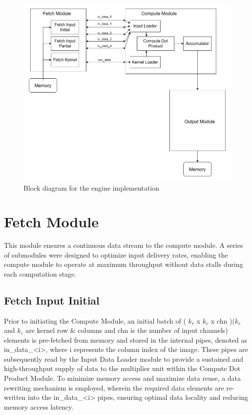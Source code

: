\begin{figure}[h]
    \centering
    \includegraphics[width=\linewidth]{../figures/Overview.png}
    \caption{Block diagram for the engine implementation}
\end{figure}
\section{Fetch Module}
This module ensures a continuous data stream to the compute module. A series of submodules were designed to optimize input delivery rates, enabling the compute module to operate at maximum throughput without data stalls during each computation stage.
\subsection{Fetch Input Initial}
Prior to initiating the Compute Module, an initial batch of ( $k_r$ x $k_c$ x chn )($k_r$ and $k_c$ are kernel row \& columns and chn is the number of input channels) elements is pre-fetched from memory and stored in the internal pipes, denoted as in\_data\_<i>, where i represents the column index of the image. These pipes are subsequently read by the Input Data Loader module to provide a sustained and high-throughput supply of data to the multiplier unit within the Compute Dot Product Module. To minimize memory access and maximize data reuse, a data rewriting mechanism is employed, wherein the required data elements are re-written into the in\_data\_<i> pipes, ensuring optimal data locality and reducing memory access latency.
